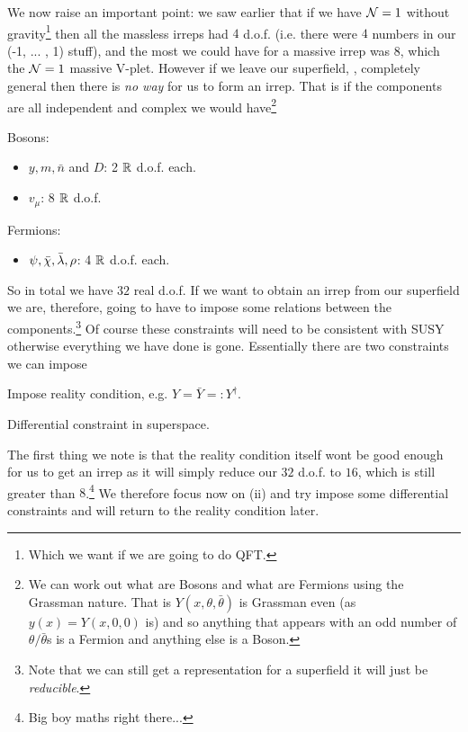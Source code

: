 We now raise an important point: we saw earlier that if we have $\mathcal{N}=1$ without gravity\footnote{Which we want if we are going to do QFT.} then all the massless irreps had $4$ d.o.f. (i.e. there were $4$ numbers in our (-1, ... , 1) stuff), and the most we could have for a massive irrep was $8$, which the $\mathcal{N}=1$ massive V-plet. However if we leave our superfield, , completely general then there is \textit{no way} for us to form an irrep. That is if the components are all independent and complex we would have\footnote{We can work out what are Bosons and what are Fermions using the Grassman nature. That is $Y(x,\theta,\bar{\theta})$ is Grassman even (as $y(x) = Y(x,0,0)$ is) and so anything that appears with an odd number of $\theta/\bar{\theta}$s is a Fermion and anything else is a Boson.} 
\ben[label=(\roman*)]
    \item Bosons: 
        \begin{itemize}
            \item $y,m, \bar{n}$ and $D$: 2 $\mathbb{R}$ d.o.f. each.
            \item $v_{\mu}$: 8 $\mathbb{R}$ d.o.f.
        \end{itemize}
    \item Fermions: 
        \begin{itemize}
            \item $\psi, \bar{\chi}, \bar{\lambda},\rho$: 4 $\mathbb{R}$ d.o.f. each.
        \end{itemize} 
\een 
So in total we have $32$ real d.o.f. If we want to obtain an irrep from our superfield we are, therefore, going to have to impose some relations between the components.\footnote{Note that we can still get a representation for a superfield it will just be \textit{reducible}.} Of course these constraints will need to be consistent with SUSY otherwise everything we have done is gone. Essentially there are two constraints we can impose
\ben[label=(\roman*)]
    \item Impose reality condition, e.g. $Y=\bar{Y} =: Y^{\dagger}$.
    \item Differential constraint in superspace. 
\een 

The first thing we note is that the reality condition itself wont be good enough for us to get an irrep as it will simply reduce our $32$ d.o.f. to $16$, which is still greater than $8$.\footnote{Big boy maths right there...} We therefore focus now on (ii) and try impose some differential constraints and will return to the reality condition later. 

